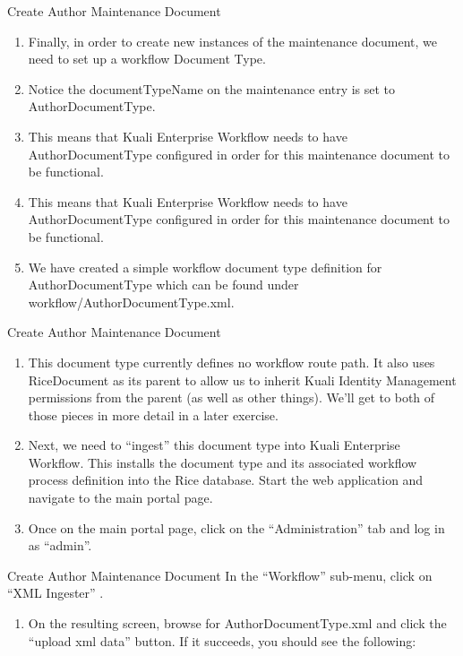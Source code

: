 \documentclass[xcolor=dvipsnames,14pt,professionalfonts]{beamer}
\begin{document}
\begin{frame}{Create Author Maintenance Document}
  \begin{enumerate}
  \item Finally, in order to create new instances of the maintenance document, we need to set up a workflow Document Type.
  \item Notice the documentTypeName on the maintenance entry is set to AuthorDocumentType.
  \item This means that Kuali Enterprise Workflow needs to have AuthorDocumentType configured in order for this maintenance document to be functional.
  \item This means that Kuali Enterprise Workflow needs to have AuthorDocumentType configured in order for this maintenance document to be functional.
  \item We have created a simple workflow document type definition for AuthorDocumentType which can be found under workflow/AuthorDocumentType.xml.
  \end{enumerate}
\end{frame}

\begin{frame}{Create Author Maintenance Document}
  \begin{enumerate}
  \item This document type currently defines no workflow route path.
    It also uses RiceDocument as its parent to allow us to inherit
    Kuali Identity Management permissions from the parent (as well as
    other things).  We’ll get to both of those pieces in more detail in a later exercise.
  \item Next, we need to “ingest” this document type into Kuali Enterprise Workflow.  This installs the document type and its associated workflow process definition into the Rice database.  Start the web application and navigate to the main portal page.
  \item Once on the main portal page, click on the “Administration” tab and log in as “admin”.
  \end{enumerate}
\end{frame}

\begin{frame}{Create Author Maintenance Document}
  In the “Workflow” sub-menu, click on “XML Ingester” .
  \begin{enumerate}
  \item On the resulting screen, browse for AuthorDocumentType.xml and click the “upload xml data” button.  If it succeeds, you should see the following:
  \end{enumerate}
\end{frame}
\end{document}
